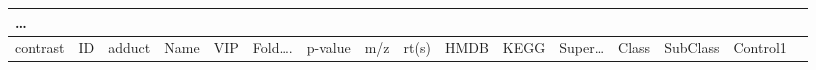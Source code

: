 \documentclass[
]{article}
\begin{document}
\begin{longtable}[]{@{}llllllllllllllll@{}}
\begin{minipage}[b]{0.02\columnwidth}
\ldots{}\strut
\end{minipage}\tabularnewline
\midrule
\endfirsthead
\toprule
\begin{minipage}[b]{0.04\columnwidth}\raggedright
contrast\strut
\end{minipage} & \begin{minipage}[b]{0.04\columnwidth}\raggedright
ID\strut
\end{minipage} & \begin{minipage}[b]{0.04\columnwidth}\raggedright
adduct\strut
\end{minipage} & \begin{minipage}[b]{0.04\columnwidth}\raggedright
Name\strut
\end{minipage} & \begin{minipage}[b]{0.04\columnwidth}\raggedright
VIP\strut
\end{minipage} & \begin{minipage}[b]{0.04\columnwidth}\raggedright
Fold\ldots.\strut
\end{minipage} & \begin{minipage}[b]{0.04\columnwidth}\raggedright
p-value\strut
\end{minipage} & \begin{minipage}[b]{0.04\columnwidth}\raggedright
m/z\strut
\end{minipage} & \begin{minipage}[b]{0.04\columnwidth}\raggedright
rt(s)\strut
\end{minipage} & \begin{minipage}[b]{0.04\columnwidth}\raggedright
HMDB\strut
\end{minipage} & \begin{minipage}[b]{0.03\columnwidth}\raggedright
KEGG\strut
\end{minipage} & \begin{minipage}[b]{0.04\columnwidth}\raggedright
Super\ldots{}\strut
\end{minipage} & \begin{minipage}[b]{0.04\columnwidth}\raggedright
Class\strut
\end{minipage} & \begin{minipage}[b]{0.04\columnwidth}\raggedright
SubClass\strut
\end{minipage} & \begin{minipage}[b]{0.04\columnwidth}\raggedright
Control1\strut
\end{minipage} & \begin{minipage}[b]{0.02\columnwidth}\raggedright

\end{minipage}
\end{longtable}
\end{document}
